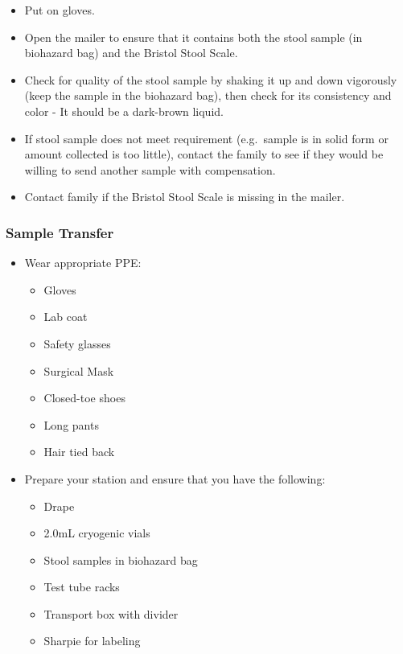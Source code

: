 \documentclass[
]{book}
\providecommand{\tightlist}{%
  \setlength{\itemsep}{0pt}\setlength{\parskip}{0pt}}
\begin{document}
\begin{itemize}
\tightlist
\item
  Put on gloves.
\item
  Open the mailer to ensure that it contains both the stool sample (in biohazard bag) and the Bristol Stool Scale.
\item
  Check for quality of the stool sample by shaking it up and down vigorously (keep the sample in the biohazard bag), then check for its consistency and color - It should be a dark-brown liquid.
\item
  If stool sample does not meet requirement (e.g.~sample is in solid form or amount collected is too little), contact the family to see if they would be willing to send another sample with compensation.
\item
  Contact family if the Bristol Stool Scale is missing in the mailer.
\end{itemize}

\hypertarget{sample-transfer}{%
\subsubsection{Sample Transfer}\label{sample-transfer}}

\begin{itemize}
\tightlist
\item
  Wear appropriate PPE:

  \begin{itemize}
  \tightlist
  \item
    Gloves
  \item
    Lab coat
  \item
    Safety glasses
  \item
    Surgical Mask
  \item
    Closed-toe shoes
  \item
    Long pants
  \item
    Hair tied back
  \end{itemize}
\item
  Prepare your station and ensure that you have the following:

  \begin{itemize}
  \tightlist
  \item
    Drape
  \item
    2.0mL cryogenic vials
  \item
    Stool samples in biohazard bag
  \item
    Test tube racks
  \item
    Transport box with divider
  \item
    Sharpie for labeling
  \end{itemize}
\end{itemize}
\end{document}

